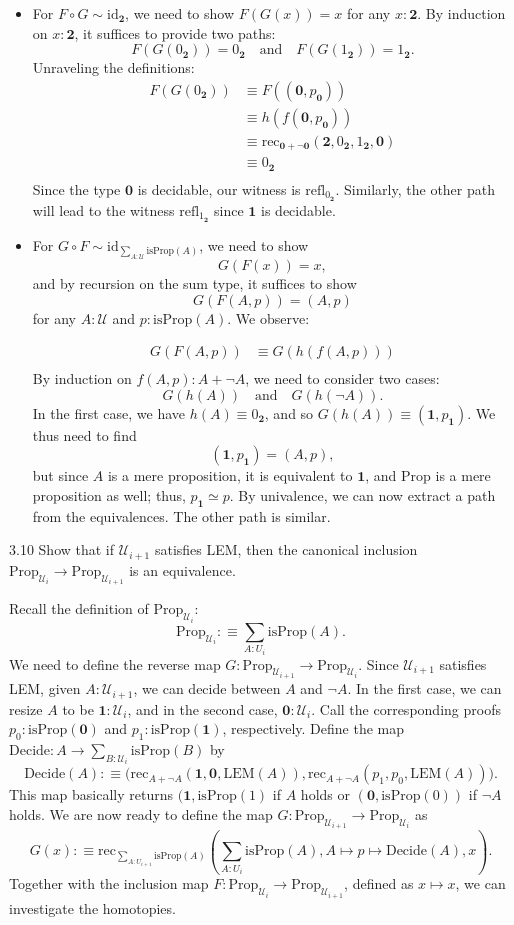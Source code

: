 \documentclass[14pt]{extarticle}
\newcommand{\0}{{\mathbf 0}}
\newcommand{\1}{{\mathbf 1}}
\newcommand{\2}{{\mathbf 2}}
\newcommand{\UU}{{\mathcal U}}
\newcommand{\mt}{\mapsto}
\newcommand{\rec}{\mathrm{rec}}
\newcommand{\refl}{\mathrm{refl}}
\newcommand{\id}{\mathrm{id}}
\newcommand{\isProp}{\mathrm{isProp}}
\newcommand{\Prop}{\mathrm{Prop}}
\newcommand{\LEM}{\mathrm{LEM}}
\newcommand{\quadt}[1]{\quad \text{#1} \quad}
\begin{document}
\begin{itemize}
\item For $F \circ G \sim \id_{\2}$, we need to show $F(G(x)) = x$ for any $x : \2$. By induction on $x : \2$, it suffices to provide two paths:
\[F(G(0_\2)) = 0_\2 \quadt{and} F(G(1_\2)) = 1_\2.\] Unraveling the definitions:
\begin{align*}
F(G(0_\2)) &\equiv F((\0, p_\0)) \\
&\equiv h(f(\0, p_\0)) \\
&\equiv \rec_{\0 + \neg \0}(\2, 0_\2, 1_\2, \0) \\
&\equiv 0_\2 \\
\end{align*}
Since the type $\0$ is decidable, our witness is $\refl_{0_\2}$. Similarly, the other path will lead to the witness $\refl_{1_\2}$ since $\1$ is decidable.

\item For $G \circ F \sim \id_{\sum_{A:\UU}\isProp(A)}$, we need to show
\[G(F(x)) = x,\] and by recursion on the sum type, it suffices to show
\[G(F(A,p)) = (A,p)\] for any $A : \UU$ and $p : \isProp(A)$. We observe:

\begin{align*}
G(F(A,p)) &\equiv G(h(f(A,p))) \\
\end{align*}
By induction on $f(A,p) : A + \neg A$, we need to consider two cases:
\[G(h(A)) \quadt{and} G(h(\neg A)).\] In the first case, we have $h(A) \equiv 0_\2$, and so $G(h(A)) \equiv (\1,p_\1)$. We thus need to find
\[(\1,p_\1) = (A,p),\] but since $A$ is a mere proposition, it is equivalent to $\1$, and $\Prop$ is a mere proposition as well; thus, $p_\1 \simeq p$. By univalence, we can now extract a path from the equivalences. The other path is similar.

\end{itemize}
 
\begin{prob}{3.10}{}
Show that if $\UU_{i+1}$ satisfies LEM, then the canonical inclusion $\text{Prop}_{\UU_i} \to \text{Prop}_{\UU_{i+1}}$ is an equivalence.
\end{prob}
Recall the definition of $\Prop_{\UU_i}$:
\[\Prop_{\UU_i}:\equiv \sum_{A : U_i}\isProp(A).\] We need to define the reverse map $G : \Prop_{\UU_{i+1}} \to \Prop_{\UU_i}$. Since $\UU_{i+1}$ satisfies LEM, given $A : \UU_{i+1}$, we can decide between $A$ and $\neg A$. In the first case, we can resize $A$ to be $\1 : \UU_i$, and in the second case, $\0 : \UU_i$. Call the corresponding proofs $p_0 : \isProp(\0)$ and $p_1 : \isProp(\1)$, respectively. Define the map $\mathrm{Decide} : A \to \sum_{B:\UU_i} \isProp(B)$ by
\[\mathrm{Decide}(A) :\equiv \Big(\rec_{A + \neg A}(\1,\0,\LEM(A)), \rec_{A + \neg A}(p_1,p_0,\LEM(A))\Big).\] This map basically returns $(\1,\isProp(1)$ if $A$ holds or $(\0,\isProp(0))$ if $\neg A$ holds. We are now ready to define the map $G: \Prop_{\UU_{i+1}} \to \Prop_{\UU_i}$ as
\[G(x) :\equiv \rec_{\sum_{A : U_{i+1}}\isProp(A)}\left(\sum_{A : U_i}\isProp(A),A \mt p \mt \mathrm{Decide}(A) ,x\right).\]
Together with the inclusion map $F : \Prop_{\UU_i} \to \Prop_{\UU_{i+1}}$, defined as $x \mt x$, we can investigate the homotopies.
\end{document}
